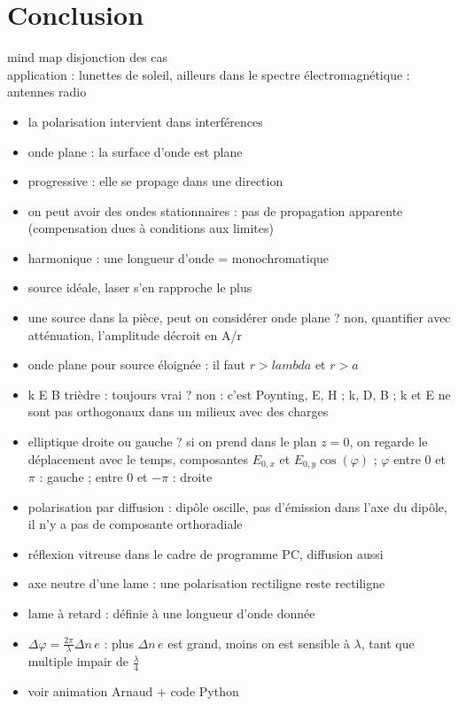 \section*{Conclusion}
mind map disjonction des cas \\
application : lunettes de soleil, ailleurs dans le spectre électromagnétique : antennes radio \\


\begin{remarques} \begin{itemize} 
\item la polarisation intervient dans interférences
\item onde plane : la surface d'onde est plane 
\item progressive : elle se propage dans une direction
\item on peut avoir des ondes stationnaires : pas de propagation apparente (compensation dues à conditions aux limites)
\item harmonique : une longueur d'onde = monochromatique
\item source idéale, laser s'en rapproche le plus
\item une source dans la pièce, peut on considérer onde plane ? non, quantifier avec atténuation, l'amplitude décroit en A/r
\item onde plane pour source éloignée : il faut $r>lambda$ et $r>a$
\item k E B trièdre : toujours vrai ? non : c'est Poynting, E, H ; k, D, B ; k et E ne sont pas orthogonaux dans un milieux avec des charges
\item elliptique droite ou gauche ? si on prend dans le plan $z=0$, on regarde le déplacement avec le temps, composantes $E_{0,x}$ et $E_{0,y} \cos (\varphi)$ ; $\varphi$ entre 0 et $\pi$ : gauche ; entre 0 et $-\pi$ : droite
\item polarisation par diffusion : dipôle oscille, pas d'émission dans l'axe du dipôle, il n'y a pas de composante orthoradiale 
\item réflexion vitreuse dans le cadre de programme PC, diffusion aussi
\item axe neutre d'une lame : une polarisation rectiligne reste rectiligne
\item lame à retard : définie à une longueur d'onde donnée
\item $\Delta\varphi=\frac{2\pi}{\lambda} \Delta n \, e$ : plus $\Delta n \, e$ est grand, moins on est sensible à $\lambda$, tant que multiple impair de $\frac{\lambda}{4}$
\item voir animation Arnaud + code Python

\end{itemize}
\end{remarques}
